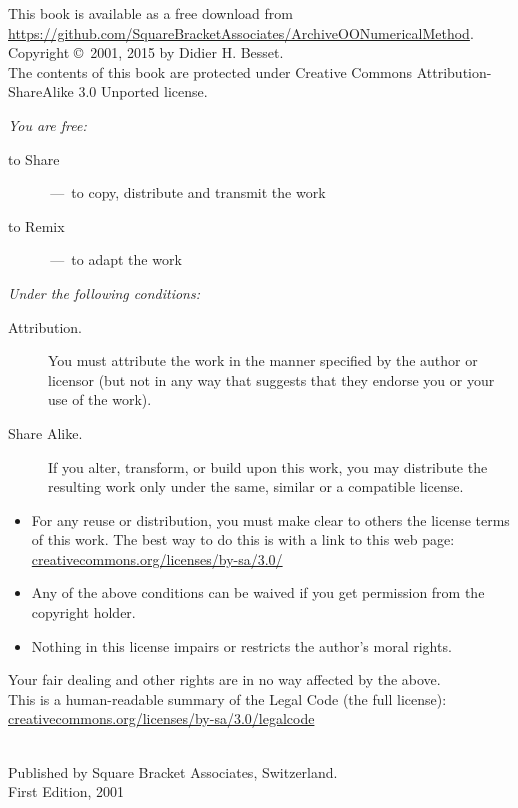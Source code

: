 \documentclass[twoside]{book}
\begin{document}
\begin{footnotesize}
\setlength{\parindent}{0pt}
This book is available as a free download from \url{https://github.com/SquareBracketAssociates/ArchiveOONumericalMethod}.\\[1cm]

Copyright \copyright~2001, 2015 by Didier H. Besset.\\[1cm]

The contents of this book are protected under Creative Commons Attribution-ShareAlike 3.0 Unported license.

\emph{You are free:}
\begin{description}
  \item[to Share] \,---\, to copy, distribute and transmit the work
  \item[to Remix] \,---\, to adapt the work
\end{description}
\emph{Under the following conditions:}
\begin{description}
  \item[Attribution.] You must attribute the work in the manner specified by the author or licensor (but not in any way that suggests that they endorse you or your use of the work).
  \item[Share Alike.] If you alter, transform, or build upon this work, you may distribute the resulting work only under the same, similar or a compatible license.
\end{description}
\begin{itemize}
  \item For any reuse or distribution, you must make clear to others the license terms of this work. The best way to do this is with a link to this web page:
  \url{creativecommons.org/licenses/by-sa/3.0/}
  \item Any of the above conditions can be waived if you get permission from the copyright holder.
  \item Nothing in this license impairs or restricts the author's moral rights.
\end{itemize}
\quad
\parbox{\textwidth}{
	Your fair dealing and other rights are in no way affected by the above.\\
	This is a human-readable summary of the Legal Code (the full license):\\
	\url{creativecommons.org/licenses/by-sa/3.0/legalcode}}\\[1cm]
Published by Square Bracket Associates, Switzerland.\\
First Edition, 2001
\end{footnotesize}
\vfill
\end{document}

